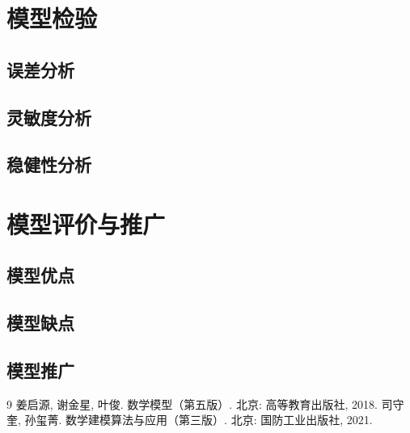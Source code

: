 \documentclass[12pt,a4paper]{ctexart}
\begin{document}
\section{模型检验}
\subsection{误差分析}
\subsection{灵敏度分析}
\subsection{稳健性分析}

\section{模型评价与推广}
\subsection{模型优点}
\subsection{模型缺点}
\subsection{模型推广}

\begin{thebibliography}{9}
 姜启源, 谢金星, 叶俊. 数学模型（第五版）. 北京: 高等教育出版社, 2018.
 司守奎, 孙玺菁. 数学建模算法与应用（第三版）. 北京: 国防工业出版社, 2021.
\end{thebibliography}
\end{document}
